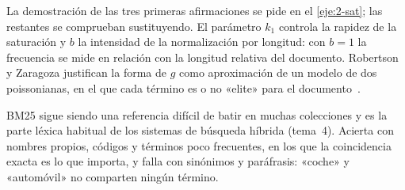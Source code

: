La demostración de las tres primeras afirmaciones se pide en el \cref{eje:2-sat}; las restantes se comprueban sustituyendo. El parámetro $k_1$ controla la rapidez de la saturación y $b$ la intensidad de la normalización por longitud: con $b=1$ la frecuencia se mide en relación con la longitud relativa del documento. Robertson y Zaragoza justifican la forma de $g$ como aproximación de un modelo de dos poissonianas, en el que cada término es o no «elite» para el documento~\cite{rz}.

\addtocounter{definicion}{1}%

\addtocounter{definicion}{1}%

\begin{observacion}
BM25 sigue siendo una referencia difícil de batir en muchas colecciones y es la parte léxica habitual de los sistemas de búsqueda híbrida (tema~4). Acierta con nombres propios, códigos y términos poco frecuentes, en los que la coincidencia exacta es lo que importa, y falla con sinónimos y paráfrasis: «coche» y «automóvil» no comparten ningún término.
\end{observacion}

